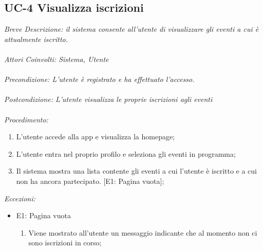 \subsection{UC-4 Visualizza iscrizioni}
\textit{Breve Descrizione: il sistema consente all'utente di visualizzare gli eventi a cui è attualmente iscritto.} 
\\
\\
\textit{Attori Coinvolti: Sistema, Utente}
\\
\\
\textit{Precondizione: L'utente è registrato e ha effettuato l'accesso.}
\\
\\
\textit{Postcondizione: L'utente visualizza le proprie iscrizioni agli eventi}
\\
\\
\textit{Procedimento:}
\begin{enumerate}
	\item L'utente accede alla app e visualizza la homepage;
	\item L'utente entra nel proprio profilo e seleziona gli eventi in programma;
	\item Il sistema mostra una lista contente gli eventi a cui l'utente è iscritto e a cui non ha ancora partecipato. [E1: Pagina vuota];
\end{enumerate}


\textit{Eccezioni:}
\begin{itemize}
	\item E1: Pagina vuota
	\begin{enumerate}
		\item Viene mostrato all'utente un messaggio indicante che al momento non ci sono iscrizioni in corso;
	\end{enumerate}
\end{itemize}
